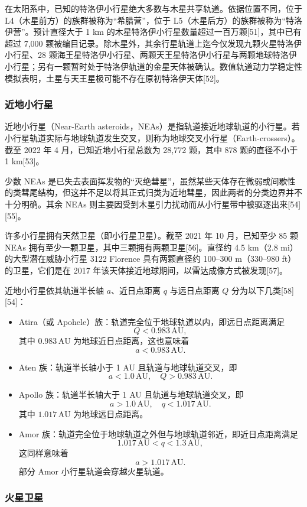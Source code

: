 在太阳系中，已知的特洛伊小行星绝大多数与木星共享轨道。依据位置不同，位于 L4（木星前方）的族群被称为“希腊营”，位于 L5（木星后方）的族群被称为“特洛伊营”。预计直径大于 1 km 的木星特洛伊小行星数量超过一百万颗[51]，其中已有超过 7{,}000 颗被编目记录。除木星外，其余行星轨道上迄今仅发现九颗火星特洛伊小行星、28 颗海王星特洛伊小行星、两颗天王星特洛伊小行星与两颗地球特洛伊小行星；另有一颗暂时处于特洛伊轨道的金星天体被确认。数值轨道动力学稳定性模拟表明，土星与天王星极可能不存在原初特洛伊天体[52]。
\subsubsection{近地小行星}
近地小行星（Near-Earth asteroids，NEAs）是指轨道接近地球轨道的小行星。若小行星轨道实际与地球轨道发生交叉，则称为地球交叉小行星（Earth-crossers）。截至 2022 年 4 月，已知近地小行星总数为 28{,}772 颗，其中 878 颗的直径不小于 1 km[53]。

少数 NEAs 是已失去表面挥发物的“灭绝彗星”，虽然某些天体存在微弱或间歇性的类彗尾结构，但这并不足以将其正式归类为近地彗星，因此两者的分类边界并不十分明确。其余 NEAs 则主要因受到木星引力扰动而从小行星带中被驱逐出来[54][55]。

许多小行星拥有天然卫星（即小行星卫星）。截至 2021 年 10 月，已知至少 85 颗 NEAs 拥有至少一颗卫星，其中三颗拥有两颗卫星[56]。直径约 4.5 km（2.8 mi）的大型潜在威胁小行星 3122 Florence 具有两颗直径约 100–300 m（330–980 ft）的卫星，它们是在 2017 年该天体接近地球期间，以雷达成像方式被发现[57]。

近地小行星依其轨道半长轴 \(a\)、近日点距离 \(q\) 与远日点距离 \(Q\) 分为以下几类[58][54]：
\begin{itemize}
\item Atira（或 Apohele）族：轨道完全位于地球轨道以内，即远日点距离满足  
   \[
   Q < 0.983\,\mathrm{AU},
   \]
   其中 \(0.983\,\mathrm{AU}\) 为地球近日点距离，这也意味着  
   \[
   a < 0.983\,\mathrm{AU}.
   \]
\item Aten 族：轨道半长轴小于 1 AU 且轨道与地球轨道交叉，即  
   \[
   a < 1.0\,\mathrm{AU},\quad Q > 0.983\,\mathrm{AU}.
   \]
\item Apollo 族：轨道半长轴大于 1 AU 且轨道与地球轨道交叉，即  
   \[
   a > 1.0\,\mathrm{AU},\quad q < 1.017\,\mathrm{AU}.
   \]
   其中 \(1.017\,\mathrm{AU}\) 为地球远日点距离。
\item Amor 族：轨道完全位于地球轨道之外但与地球轨道邻近，即近日点距离满足  
   \[
   1.017\,\mathrm{AU} < q < 1.3\,\mathrm{AU},
   \]
   这同样意味着  
   \[
   a > 1.017\,\mathrm{AU}.
   \]
   部分 Amor 小行星轨道会穿越火星轨道。
\end{itemize}
\subsubsection{火星卫星}



